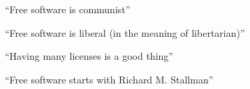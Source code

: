\begin{frame}

\begin{center}
\huge{``Free software is communist''}
\end{center}

\end{frame}



\begin{frame}

\begin{center}
\huge{``Free software is liberal (in the meaning of libertarian)''}
\end{center}

\end{frame}



\begin{frame}

\begin{center}
\huge{``Having many licenses is a good thing''}
\end{center}

\end{frame}



\begin{frame}

\begin{center}
\huge{``Free software starts with Richard M. Stallman''}
\end{center}

\end{frame}



